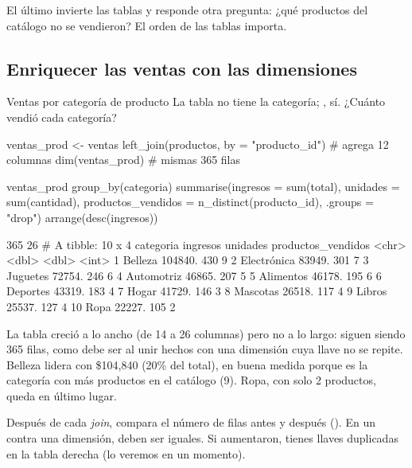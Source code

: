 El último  invierte las tablas y responde otra
pregunta: ¿qué productos del catálogo no se vendieron? El orden de las
tablas importa.

\subsection{Enriquecer las ventas con las dimensiones}

\begin{ejemplo}{Ventas por categoría de producto}
La tabla  no tiene la categoría; , sí.
¿Cuánto vendió cada categoría?
\end{ejemplo}

\begin{rcode}
ventas_prod <- ventas %
  left_join(productos, by = "producto_id")   # agrega 12 columnas
dim(ventas_prod)                              # mismas 365 filas

ventas_prod %
  group_by(categoria) %
  summarise(ingresos = sum(total), unidades = sum(cantidad),
            productos_vendidos = n_distinct(producto_id),
            .groups = "drop") %
  arrange(desc(ingresos))
\end{rcode}
\begin{rsalida}
[1] 365  26
# A tibble: 10 x 4
   categoria   ingresos unidades productos_vendidos
   <chr>          <dbl>    <dbl>              <int>
 1 Belleza      104840.      430                  9
 2 Electrónica   83949.      301                  7
 3 Juguetes      72754.      246                  6
 4 Automotriz    46865.      207                  5
 5 Alimentos     46178.      195                  6
 6 Deportes      43319.      183                  4
 7 Hogar         41729.      146                  3
 8 Mascotas      26518.      117                  4
 9 Libros        25537.      127                  4
10 Ropa          22227.      105                  2
\end{rsalida}

La tabla creció a lo ancho (de 14 a 26 columnas) pero no a lo largo: siguen
siendo 365 filas, como debe ser al unir hechos con una dimensión cuya llave
no se repite. Belleza lidera con \$104,840 (20\% del total), en buena medida
porque es la categoría con más productos en el catálogo (9). Ropa, con solo 2
productos, queda en último lugar.

\begin{consejo}
Después de cada \emph{join}, compara el número de filas antes y después
(). En un  contra una dimensión, deben
ser iguales. Si aumentaron, tienes llaves duplicadas en la tabla derecha (lo
veremos en un momento).
\end{consejo}

